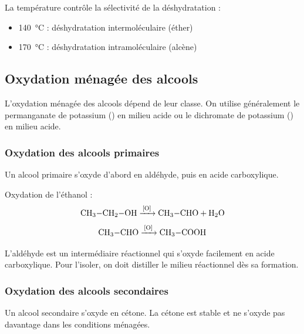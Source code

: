\begin{aretenir}
La température contrôle la sélectivité de la déshydratation :
\begin{itemize}
\item \SI{140}{\celsius} : déshydratation intermoléculaire (éther)
\item \SI{170}{\celsius} : déshydratation intramoléculaire (alcène)
\end{itemize}
\end{aretenir}

\subsection{Oxydation ménagée des alcools}

L'oxydation ménagée des alcools dépend de leur classe. On utilise généralement le permanganate de potassium () en milieu acide ou le dichromate de potassium () en milieu acide.

\subsubsection{Oxydation des alcools primaires}

\begin{propriete}
Un alcool primaire s'oxyde d'abord en aldéhyde, puis en acide carboxylique.
\end{propriete}

\begin{exemple}
Oxydation de l'éthanol :
\[\ce{CH3-CH2-OH ->[{[O]}] CH3-CHO + H2O}\]
\[\ce{CH3-CHO ->[{[O]}] CH3-COOH}\]
\end{exemple}

\begin{remarque}
L'aldéhyde est un intermédiaire réactionnel qui s'oxyde facilement en acide carboxylique. Pour l'isoler, on doit distiller le milieu réactionnel dès sa formation.
\end{remarque}

\subsubsection{Oxydation des alcools secondaires}

\begin{propriete}
Un alcool secondaire s'oxyde en cétone. La cétone est stable et ne s'oxyde pas davantage dans les conditions ménagées.
\end{propriete}

